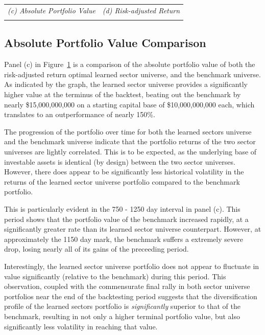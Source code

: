 \documentclass[../main.tex]{subfiles}
\begin{document}
\begin{table}[!h]
\begin{tabular}{|c|c|}
        \textit{(c) Absolute Portfolio Value} & \textit{(d) Risk-adjusted Return} \\
        & \\
        \hline
    \end{tabular}
    \label{fig:benchmark_comparison:performance_metrics}
\end{table}


\subsection{Absolute Portfolio Value Comparison}

Panel (c) in Figure~\ref{fig:benchmark_comparison:performance_metrics} is a comparison of the absolute portfolio value of both the risk-adjusted return optimal learned sector universe, and the benchmark universe. As indicated by the graph, the learned sector universe provides a significantly higher value at the terminus of the backtest, beating out the benchmark by nearly \$15,000,000,000 on a starting capital base of \$10,000,000,000 each, which translates to an outperformance of nearly 150\%.

The progression of the portfolio over time for both the learned sectors universe and the benchmark universe indicate that the portfolio returns of the two sector universes are lightly correlated. This is to be expected, as the underlying base of investable assets is identical (by design) between the two sector universes. However, there does appear to be significantly less historical volatility in the returns of the learned sector universe portfolio compared to the benchmark portfolio.

This is particularly evident in the 750 - 1250 day interval in panel (c). This period shows that the portfolio value of the benchmark increased rapidly, at a significantly greater rate than its learned sector universe counterpart. However, at approximately the 1150 day mark, the benchmark suffers a extremely severe drop, losing nearly all of its gains of the preceeding period.

Interestingly, the learned sector universe portfolio does not appear to fluctuate in value significantly (relative to the benchmark) during this period. This observation, coupled with the commensurate final rally in both sector universe portfolios near the end of the backtesting period suggests that the diversification profile of the learned sectors portfolio is \textit{significantly} superior to that of the benchmark, resulting in not only a higher terminal portfolio value, but also significantly less volatility in reaching that value.
\end{document}
